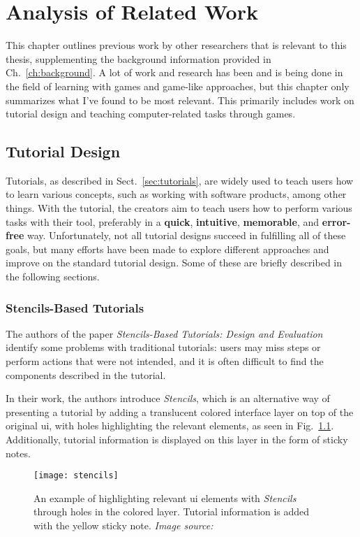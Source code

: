 \chapter{Analysis of Related Work}
\label{ch:related_work}
This chapter outlines previous work by other researchers that is relevant to this thesis, supplementing the background information provided in Ch.~\ref{ch:background}. A lot of work and research has been and is being done in the field of learning with games and game-like approaches, but this chapter only summarizes what I've found to be most relevant. This primarily includes work on tutorial design and teaching computer-related tasks through games.

\section{Tutorial Design}
\label{sec:tutorial_design_related}
Tutorials, as described in Sect.~\ref{sec:tutorials}, are widely used to teach users how to learn various concepts, such as working with software products, among other things. With the tutorial, the creators aim to teach users how to perform various tasks with their tool, preferably in a \textbf{quick}, \textbf{intuitive}, \textbf{memorable}, and \textbf{error-free} way. Unfortunately, not all tutorial designs succeed in fulfilling all of these goals, but many efforts have been made to explore different approaches and improve on the standard tutorial design. Some of these are briefly described in the following sections.

\subsection{Stencils-Based Tutorials}
\label{sec:stencils}
The authors of the paper \emph{Stencils-Based Tutorials: Design and Evaluation}~\cite{kelleher:stencils} identify some problems with traditional tutorials: users may miss steps or perform actions that were not intended, and it is often difficult to find the components described in the tutorial.

\noindent
In their work, the authors introduce \emph{Stencils}, which is an alternative way of presenting a tutorial by adding a translucent colored interface layer on top of the original \gls{ui}, with holes highlighting the relevant elements, as seen in Fig.~\ref{fig:stencils}. Additionally, tutorial information is displayed on this layer in the form of sticky notes.

\begin{figure}[htp]
	\centering
	\texttt{[image: stencils]}
	\caption[\emph{Stencils} example]{An example of highlighting relevant \gls{ui} elements with \emph{Stencils} through holes in the colored layer. Tutorial information is added with the yellow sticky note. \emph{Image source:~\cite{kelleher:stencils}}}
	\label{fig:stencils}
\end{figure}

